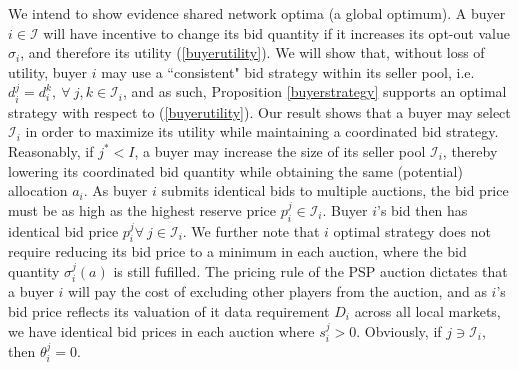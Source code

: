 \documentclass[12pt]{article}
\theoremstyle{definition}
\newcommand{\mcI}{\mathcal{I}}
\newcommand{\g}{\sigma}
\begin{document}
\begin{multicols}{2}
We intend to show evidence shared network optima (a
global optimum). 
A buyer $i\in\mcI$ will have incentive to change its bid
quantity if it increases its opt-out value $\g_i$, and therefore its utility (\ref{buyerutility}). 
We will show that, without loss of utility, buyer $i$ may  
use a ``consistent" bid strategy within its seller pool, i.e. $d_i^j = d_i^k, \
\forall \ j,k \in \mcI_i$, and as such,
Proposition \ref{buyerstrategy} supports an optimal strategy with respect to
(\ref{buyerutility}). 
Our result shows that a buyer may select $\mcI_i$ in order to maximize its
utility while maintaining a coordinated bid strategy. 
Reasonably, if $j^*< I$, a buyer may increase the size of its seller pool
$\mcI_i$, thereby lowering its coordinated bid
quantity while obtaining the same (potential) allocation $a_i$. 
As buyer $i$ submits identical bids to multiple auctions, the bid price must be
as high as the highest reserve price $p_i^j \in \mcI_i$.
Buyer $i$'s bid then has identical bid price $p_i^j \forall \ j \in\mcI_i$. 
We further note that $i$ optimal strategy does not require reducing its bid price to a
minimum in each auction, where
the bid quantity $\g_i^j(a)$ is still fufilled. The pricing rule of the PSP
auction dictates that a buyer $i$ will pay the cost of excluding other players from
the auction, and as $i$'s bid price reflects its valuation of it data
requirement $D_i$ across all local markets, we have identical bid prices in
each auction where $s_i^j>0$. Obviously, if $j\ni\mcI_i$, then $\theta_i^j = 0$.


\end{multicols}
\end{document}
